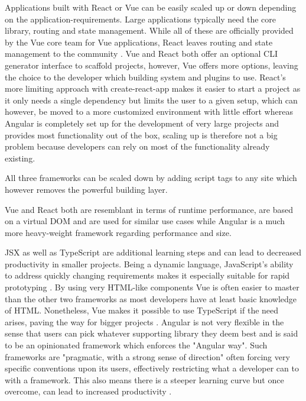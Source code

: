 Applications built with React or Vue can be easily scaled up or down depending on the application-requirements. Large applications typically need the core library, routing and state management. While all of these are officially provided by the Vue core team for Vue applications, React leaves routing and state management to the community \cite{ComparisonVue:online}. Vue and React both offer an optional CLI generator interface to scaffold projects, however, Vue offers more options, leaving the choice to the developer which building system and plugins to use. React's more limiting approach with create-react-app makes it easier to start a project as it only needs a single dependency but limits the user to a given setup, which can however, be moved to a more customized environment with little effort whereas Angular is completely set up for the development of very large projects and provides most functionality out of the box, scaling up is therefore not a big problem because developers can rely on most of the functionality already existing.

All three frameworks can be scaled down by adding script tags to any site \cite{AddingReact:online, ComparisonVue:online} which however removes the powerful building layer.

Vue and React both are resemblant in terms of runtime performance, are based on a virtual DOM and are used for similar use cases while Angular is a much more heavy-weight framework regarding performance and size. 

JSX as well as TypeScript are additional learning steps and can lead to decreased productivity in smaller projects. Being a dynamic language, JavaScript's ability to address quickly changing requirements makes it especially suitable for rapid prototyping \cite[p.~72]{DynamicallyTypedLanguages:proceedings}. By using very HTML-like components Vue is often easier to master than the other two frameworks as most developers have at least basic knowledge of HTML. Nonetheless, Vue makes it possible to use TypeScript if the need arises, paving the way for bigger projects \cite{VueTypeScript:online}. Angular is not very flexible in the sense that users can pick whatever supporting library they deem best and is said to be an opinionated framework which enforces the "Angular way". Such frameworks are "pragmatic, with a strong sense of direction" \cite{Bedell:Opinionated:article} often forcing very specific conventions upon its users, effectively restricting what a developer can to with a framework. This also means there is a steeper learning curve but once overcome, can lead to increased productivity \cite{ComparisonVue:online}.


